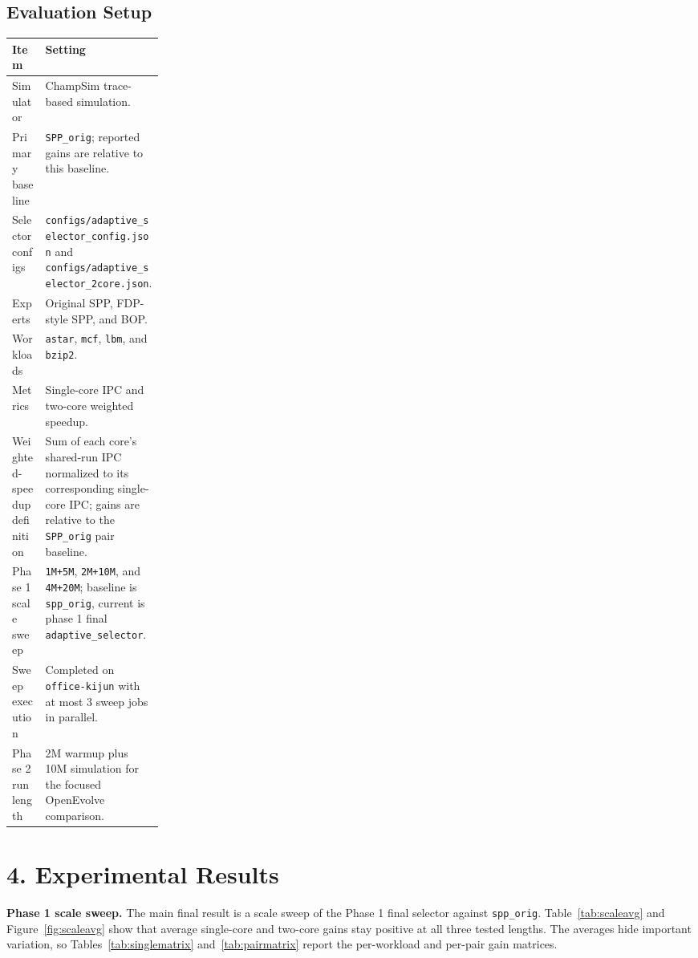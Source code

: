 \documentclass[10pt,letterpaper]{article}
\newcommand{\code}[1]{\texttt{#1}}
\begin{document}
\newpage
\subsection*{Evaluation Setup}

\begin{center}
\small
\captionsetup{hypcap=false}
\label{tab:setup}
\begin{tabularx}{\linewidth}{@{}p{0.22\linewidth}X@{}}
\toprule
Item & Setting \\
\midrule
Simulator & ChampSim trace-based simulation. \\
Primary baseline & \code{SPP\_orig}; reported gains are relative to this baseline. \\
Selector configs & \code{configs/adaptive\_selector\_config.json} and \code{configs/adaptive\_selector\_2core.json}. \\
Experts & Original SPP, FDP-style SPP, and BOP. \\
Workloads & \code{astar}, \code{mcf}, \code{lbm}, and \code{bzip2}. \\
Metrics & Single-core IPC and two-core weighted speedup. \\
Weighted-speedup definition & Sum of each core's shared-run IPC normalized to its corresponding single-core IPC; gains are relative to the \code{SPP\_orig} pair baseline. \\
Phase 1 scale sweep & \code{1M+5M}, \code{2M+10M}, and \code{4M+20M}; baseline is \code{spp\_orig}, current is phase 1 final \code{adaptive\_selector}. \\
Sweep execution & Completed on \code{office-kijun} with at most 3 sweep jobs in parallel. \\
Phase 2 run length & 2M warmup plus 10M simulation for the focused OpenEvolve comparison. \\
\bottomrule
\end{tabularx}
\end{center}

\section*{4. Experimental Results}

\noindent\textbf{Phase 1 scale sweep.}
The main final result is a scale sweep of the Phase 1 final selector against
\code{spp\_orig}. Table~\ref{tab:scaleavg} and Figure~\ref{fig:scaleavg} show
that average single-core and two-core gains stay positive at all three tested
lengths. The averages hide important variation, so Tables~\ref{tab:singlematrix}
and~\ref{tab:pairmatrix} report the per-workload and per-pair gain matrices.
\end{document}
